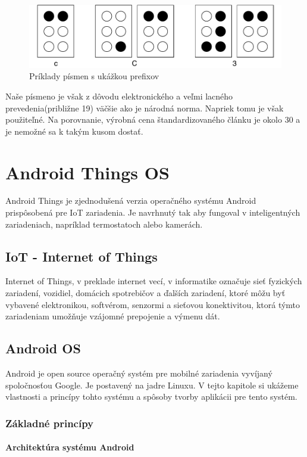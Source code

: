 \documentclass{template/socthesis}
\begin{document}
\begin{center}
	\begin{figure}[htp]
		\centering
		\includegraphics[scale=0.8]{braille}
		\caption{Príklady písmen s ukážkou prefixov}
	\end{figure}
\end{center}

Naše písmeno je však z dôvodu elektronického a veľmi lacného prevedenia(približne 19) väčšie ako je národná norma. Napriek tomu je však použiteľné. Na porovnanie, výrobná cena štandardizovaného článku je okolo 30 a je nemožné sa k takým kusom dostať.
\newpage
\chapter{Android Things OS}
Android Things je zjednodušená verzia operačného systému Android prispôsobená pre IoT zariadenia. Je navrhnutý tak aby fungoval v inteligentných zariadeniach, napríklad termostatoch alebo kamerách.

\section{IoT - Internet of Things}
Internet of Things, v preklade internet vecí, v informatike označuje sieť fyzických zariadení, vozidiel, domácich spotrebičov a ďalších zariadení, ktoré môžu byť vybavené elektronikou, softvérom, senzormi a sieťovou konektivitou, ktorá týmto zariadeniam umožňuje vzájomné prepojenie a výmenu dát. \cite{karimi2013internet}
\section{Android OS}
Android je open source operačný systém pre mobilné zariadenia vyvíjaný spoločnosťou Google. Je postavený na jadre Linuxu. V tejto kapitole si ukážeme vlastnosti  a princípy tohto systému a spôsoby tvorby aplikácii pre tento systém.

\subsection{Základné princípy}
\subsubsection{Architektúra systému Android}
\end{document}
